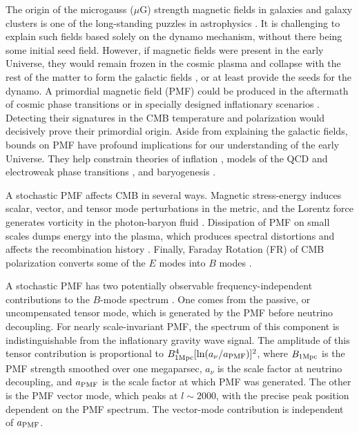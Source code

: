 The origin of the microgauss ($\mu$G) strength magnetic fields in galaxies and galaxy clusters is one of the long-standing puzzles in astrophysics \cite{Durrer:2013pga}. It is challenging to explain such fields based solely on the dynamo mechanism, without there being some initial seed field. However, if magnetic fields were present in the early Universe, they would remain frozen in the cosmic plasma and collapse with the rest of the matter to form the galactic fields \cite{Grasso:2000wj}, or at least provide the seeds for the dynamo. A primordial magnetic field (PMF) could be produced in the aftermath of cosmic phase transitions \cite{Vachaspati:1991nm} or in specially designed inflationary scenarios \cite{Turner:1987bw,Ratra:1991bn}. Detecting their signatures in the CMB temperature and polarization would decisively prove their primordial origin. Aside from explaining the galactic fields, bounds on PMF have profound implications for our understanding of the early Universe.  They help constrain theories of inflation \cite{Bonvin:2011dt}, models of the QCD and electroweak phase transitions \cite{Caprini:2007xq}, and baryogenesis \cite{Vachaspati:2001nb}.

A stochastic PMF affects CMB in several ways. Magnetic stress-energy induces scalar, vector, and tensor mode perturbations in the metric, and the Lorentz force generates vorticity in the photon-baryon fluid \cite{Subramanian:1998fn,Mack:2001gc,Lewis:2004ef,Shaw:2009nf,Paoletti:2010rx}. Dissipation of PMF on small scales dumps energy into the plasma, which produces spectral distortions and affects the recombination history \cite{Kunze:2014eka}.  Finally, Faraday Rotation (FR) of CMB polarization converts some of the $E$ modes into $B$ modes \cite{Kosowsky:2004zh,Pogosian:2011qv}.

A stochastic PMF has two potentially observable frequency-independent contributions to the $B$-mode spectrum \cite{Shaw:2009nf}. One comes from the passive, or uncompensated tensor mode, which is generated by the PMF before neutrino decoupling. For nearly scale-invariant PMF, the spectrum of this component is indistinguishable from the inflationary gravity wave signal. The amplitude of this tensor contribution is proportional to $B^4_{1\rm{Mpc}} [\ln(a_\nu / a_{\rm{PMF}})]^2$, where $B_{1\rm{Mpc}}$ is the PMF strength smoothed over one megaparsec, $a_\nu$ is the scale factor at neutrino decoupling, and $a_{\rm{PMF}}$ is the scale factor at which PMF was generated. The other is the PMF vector mode, which peaks at $l \sim 2000$, with the precise peak position dependent on the PMF spectrum. The vector-mode contribution is independent of $a_{\rm{PMF}}$. 

